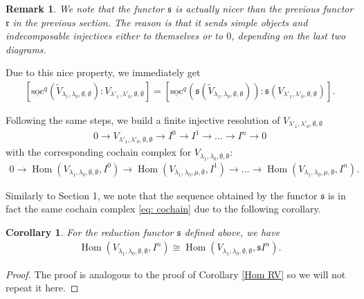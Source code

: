 \documentclass[openany, a4paper]{amsbook}
\newtheorem{cor}[thm]{Corollary}
\newtheorem{rmk}[thm]{Remark}
\theoremstyle{definition}
\numberwithin{equation}{chapter}
\newcommand{\socl}[2]{\underline{\mathrm{soc}}^{#1}({#2})}
\DeclareMathOperator{\Hom}{\mathrm{Hom}}
\begin{document}
\begin{rmk}
    We note that the functor $\mathfrak{s}$ is actually nicer than the previous functor $\mathfrak{r}$ in the previous section. The reason is that it sends simple objects and indecomposable injectives either to themselves or to $0$, depending on the last two diagrams.
\end{rmk}

Due to this nice property, we immediately get 
\begin{align*}
    \left[ \socl{q}{\tilde{V}_{\lambda_1, \lambda_0, \emptyset, \emptyset}} \colon V_{\lambda'_1, \lambda'_0, \emptyset, \emptyset }  \right] = \left[ \socl{q}{\mathfrak{s}(\tilde{V}_{\lambda_1, \lambda_0, \emptyset, \emptyset})} \colon \mathfrak{s}(V_{\lambda'_1, \lambda'_0, \emptyset, \emptyset } ) \right].
\end{align*}

Following the same steps, we build a finite injective resolution of $V_{\lambda'_1, \lambda'_0, \emptyset, \emptyset}$
\begin{align}
    0 \to V_{\lambda'_1, \lambda'_0, \emptyset, \emptyset} \to I^0 \to I^1 \to ...\to I^n \to 0
\end{align}
with the corresponding cochain complex for $V_{\lambda_1, \lambda_0, \emptyset, \emptyset}$:
\begin{align}\label{eq: cochain}
    0 \to  \Hom (V_{\lambda_1, \lambda_0, \emptyset, \emptyset}, I^0) \to \Hom (V_{\lambda_1, \lambda_0, \mu, \emptyset}, I^1) \to ... \to \Hom (V_{\lambda_1, \lambda_0, \mu, \emptyset}, I^n).
\end{align}

Similarly to Section 1, we note that the sequence obtained by the functor $\mathfrak{s}$ is in fact the same cochain complex \eqref{eq: cochain} due to the following corollary.

\begin{cor}
    For the reduction functor $\mathfrak{s}$ defined above, we have
    \begin{align*}
        \Hom(V_{\lambda_1, \lambda_0, \emptyset, \emptyset}, I^n) \cong \Hom(V_{\lambda_1, \lambda_0, \emptyset, \emptyset}, \mathfrak{s}I^n).
    \end{align*}
\end{cor}

\begin{proof}
    The proof is analogous to the proof of Corollary \ref{Hom RV} so we will not repeat it here.
\end{proof}
\end{document}
